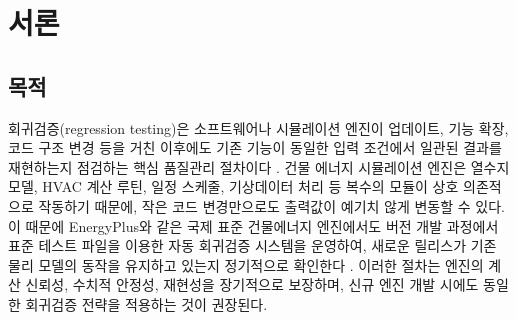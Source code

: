 \part{서론}
\label{part:introduction}


\chapter{목적}

회귀검증(regression testing)은 소프트웨어나 시뮬레이션 엔진이 업데이트, 기능 확장, 코드 구조 변경 등을 거친 이후에도 기존 기능이 동일한 입력 조건에서 일관된 결과를 재현하는지 점검하는 핵심 품질관리 절차이다 \cite{sommerville2015software}.
건물 에너지 시뮬레이션 엔진은 열수지 모델, HVAC 계산 루틴, 일정 스케줄, 기상데이터 처리 등 복수의 모듈이 상호 의존적으로 작동하기 때문에, 작은 코드 변경만으로도 출력값이 예기치 않게 변동할 수 있다.
이 때문에 EnergyPlus와 같은 국제 표준 건물에너지 엔진에서도 버전 개발 과정에서 표준 테스트 파일을 이용한 자동 회귀검증 시스템을 운영하여, 새로운 릴리스가 기존 물리 모델의 동작을 유지하고 있는지 정기적으로 확인한다 \cite{EnergyPlusValidation}\cite{EnergyPlusRegressionTool}.
이러한 절차는 엔진의 계산 신뢰성, 수치적 안정성, 재현성을 장기적으로 보장하며, 신규 엔진 개발 시에도 동일한 회귀검증 전략을 적용하는 것이 권장된다.


